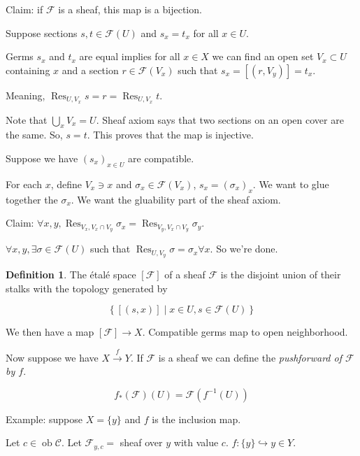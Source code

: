 \documentclass{article}
\theoremstyle{definition}
\newtheorem*{definition}{Definition}
\begin{document}
    Claim: if \(\mathcal{F}\) is a sheaf, this map is a bijection.

    Suppose sections \(s,t \in \mathcal{F}(U)\) and \(s_x = t_x\) for all \(x\in U\).

    Germs \(s_x\) and \(t_x\) are equal implies for all \(x\in X\) we can find an open set \(V_x \subset U\) containing \(x\) and a section \(r\in \mathcal{F}(V_x)\) such that \(s_x  = [(r,V_y)] = t_x\).
    
    Meaning, \(\operatorname{Res}_{U,V_x} s = r = \operatorname{Res}_{U, V_x} t\).

    Note that \(\bigcup_x V_x = U\). Sheaf axiom says that two sections on an open cover are the same. So, \(s=t\). This proves that the map is injective.

    Suppose we have \((s_x)_{x\in U}\) are compatible.

    For each \(x\), define \(V_x \ni x\) and \(\sigma_x \in \mathcal{F}(V_x)\), \(s_x = (\sigma_x)_x\). We want to glue together the \(\sigma_x\). We want the gluability part of the sheaf axiom.

    Claim: \(\forall x,y, \operatorname{Res}_{V_x, V_x \cap V_y} \sigma_x = \operatorname{Res}_{V_y, V_x \cap V_y} \sigma_y\).
    
    \(\forall x,y, \exists \sigma \in \mathcal{F}(U)\) such that \(\operatorname{Res}_{U,V_y} \sigma = \sigma_x \forall x\). So we're done. 

    \begin{definition}
        The \'etal\'e space \([\mathcal{F}]\) of a sheaf \(\mathcal{F}\) is the disjoint union of their stalks with the topology generated by

        \[
            \left\{ [(s,x)] \mid x\in U, s\in \mathcal{F}(U) \right\} 
        \]
    \end{definition}

    We then have a map \([\mathcal{F}] \to X\). Compatible germs map to open neighborhood.

    Now suppose we have \(X \xrightarrow{f} Y\). If \(\mathcal{F}\) is a sheaf we can define the \textit{pushforward of \(\mathcal{F}\) by \(f\)}.

    \[
        f_{\ast} (\mathcal{F})(U) = \mathcal{F}(f ^{-1} (U))
    \]

    Example: suppose \(X = \{ y \}\) and \(f\) is the inclusion map.

    Let \(c \in \operatorname{ob} \mathcal{C}\). Let \(\mathcal{F}_{y,c}=\) sheaf over \(y\) with value \(c\). \(f: \{ y \} \hookrightarrow y \in Y\).
    
\end{document}
